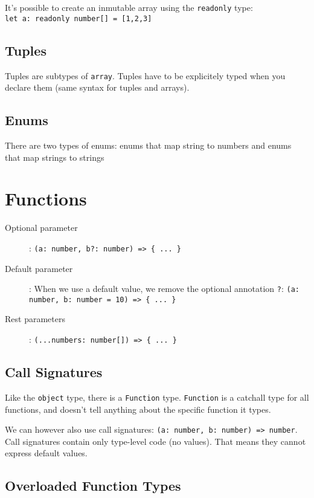 \documentclass[french]{article}
\begin{document}
It's possible to create an inmutable array using the \lstinline{readonly} type: \\\lstinline{let a: readonly number[] = [1,2,3]}

\subsection{Tuples}

Tuples are subtypes of \lstinline{array}. Tuples have to be explicitely typed when you declare them (same syntax for tuples and arrays).

\subsection{Enums}

There are two types of enums: enums that map string to numbers and enums that map strings to strings

\section{Functions}

\begin{description}
  \item[Optional parameter]: \lstinline|(a: number, b?: number) => { ... }|
  \item[Default parameter]: When we use a default value, we remove the optional annotation \lstinline{?}: \lstinline|(a: number, b: number = 10) => { ... }|
  \item[Rest parameters]: \lstinline|(...numbers: number[]) => { ... }|
\end{description}

\subsection{Call Signatures}

Like the \lstinline{object} type, there is a \lstinline{Function} type. \lstinline{Function} is a catchall type for all functions, and doesn't tell anything about the specific function it types.

We can however also use call signatures: \lstinline{(a: number, b: number) => number}. Call signatures contain only type-level code (no values). That means they cannot express default values.

\subsection{Overloaded Function Types}
\end{document}
